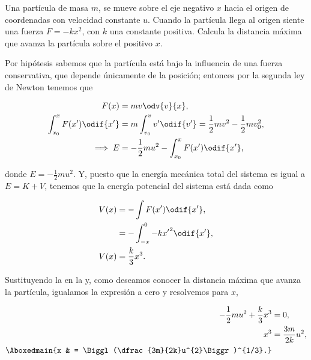 \documentclass[../main.tex]{subfiles}
\begin{document}
\begin{problema}
	Una partícula de masa \(m\), se mueve sobre el
	eje negativo \(x\) hacia el origen de coordenadas
	con velocidad constante \(u\). Cuando la partícula
	llega al origen siente una fuerza \(F = -kx^{2}\),
	con \(k\) una constante positiva. Calcula la
	distancia máxima que avanza la partícula sobre el
	positivo \(x\).
\end{problema}

\startsolution

Por hipótesis sabemos que la partícula está bajo la influencia
de una fuerza conservativa, que depende únicamente de la
posición; entonces por la segunda ley de Newton tenemos que

\begin{align}
	F(x)                                             & = mv\odv{v}{x},\nonumber                                                                                 \\
	\int_{x_{0}}^{x} F(x^{\prime}) \odif{x^{\prime}} & = m\int_{v_{0}}^{v} v^{\prime} \odif{v^{\prime}} = \dfrac{1}{2}mv^{2} - \dfrac{1}{2}mv_{0}^{2},\nonumber \\
	\Longrightarrow\; E                              & = -\dfrac{1}{2}mu^{2} - \int_{x_{0}}^{x} F(x^{\prime}) \odif{x^{\prime}},\label{eq:energy}
\end{align}

donde \(E = -\tfrac{1}{2}mu^{2}\). Y, puesto que la energía mecánica total del sistema
es igual a \( E = K + V\), tenemos que la energía potencial del sistema
está dada como

\begin{align}
	V(x) & = -\int F(x^{\prime}) \odif{x^{\prime}},\nonumber                \\
	     & = - \int_{-x}^{0} -k{x^{\prime}}^{2} \odif{x^{\prime}},\nonumber \\
	V(x) & = \dfrac{k}{3}x^{3}.\label{eq:PotentialEnergy}
\end{align}

Sustituyendo la  en la  y,
como deseamos conocer la distancia máxima que avanza la partícula, igualamos la expresión
a cero y resolvemos para \(x\),

\begin{align*}
	-\dfrac{1}{2}mu^{2} + \dfrac{k}{3}x^{3} & = 0,                                        \\
	x^{3}                                   & = \dfrac{3m}{2k}u^{2},                      \\
	\Aboxedmain{x                           & = \Biggl(\dfrac{3m}{2k}u^{2}\Biggr)^{1/3}.}
\end{align*}
\end{document}
